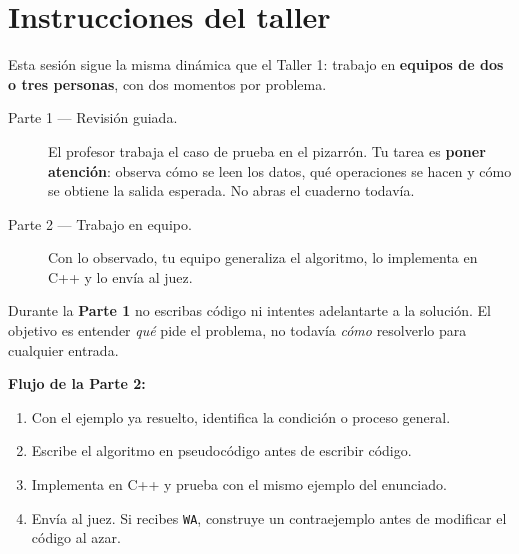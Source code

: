\documentclass[12pt, oneside]{article}
\begin{document}

\tableofcontents
\newpage

\section{Instrucciones del taller}

Esta sesión sigue la misma dinámica que el Taller 1: trabajo en
\textbf{equipos de dos o tres personas}, con dos momentos por problema.

\begin{description}
  \item[Parte 1 — Revisión guiada.]
    El profesor trabaja el caso de prueba en el pizarrón.
    Tu tarea es \textbf{poner atención}: observa cómo se leen los datos,
    qué operaciones se hacen y cómo se obtiene la salida esperada.
    No abras el cuaderno todavía.

  \item[Parte 2 — Trabajo en equipo.]
    Con lo observado, tu equipo generaliza el algoritmo, lo implementa en
    C++ y lo envía al juez.
\end{description}

\begin{advertencia}
  Durante la \textbf{Parte 1} no escribas código ni intentes adelantarte
  a la solución.  El objetivo es entender \emph{qué} pide el problema,
  no todavía \emph{cómo} resolverlo para cualquier entrada.
\end{advertencia}

\begin{consejo}
  \textbf{Flujo de la Parte 2:}
  \begin{enumerate}
    \item Con el ejemplo ya resuelto, identifica la condición o proceso
          general.
    \item Escribe el algoritmo en pseudocódigo antes de escribir código.
    \item Implementa en C++ y prueba con el mismo ejemplo del enunciado.
    \item Envía al juez.  Si recibes \texttt{WA}, construye un
          contraejemplo antes de modificar el código al azar.
  \end{enumerate}
\end{consejo}
\end{document}
